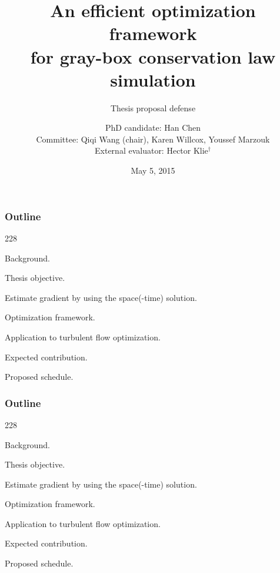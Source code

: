 \documentclass{beamer}
\title{An efficient optimization framework\\ for gray-box conservation law simulation}
\subtitle{Thesis proposal defense}
\author{\scriptsize
   PhD candidate: Han Chen\\\vspace{0.5cm} Committee: Qiqi Wang (chair), Karen Willcox, Youssef Marzouk\\
   External evaluator: Hector Klie$^\dagger$}
\institute{Massachusetts Institute of Technology\\ $^\dagger$ ConocoPhillips Inc.}
\date{\scriptsize May 5, 2015}
\newcommand{\barrow}{\item[\color{darkred}\ding{228}]}
\begin{document}
\begin{frame}
    \titlepage
\end{frame}

\setcounter{framenumber}{0}
\begin{frame}
    \frametitle{Outline}\small
    \begin{dinglist}{228}
        \barrow {}Background.
        \barrow Thesis objective.
        \vspace{.35cm}
        \barrow Estimate gradient by using the space(-time) solution.
        \barrow Optimization framework.
        \barrow Application to turbulent flow optimization.
        \vspace{.35cm}
        \barrow Expected contribution.
        \barrow Proposed schedule.
    \end{dinglist}
\end{frame}

\setcounter{framenumber}{0}
\begin{frame}
    \frametitle{Outline}\small
    \begin{dinglist}{228}
        \barrow Background.
        \barrow Thesis objective.
        \vspace{.35cm}
        \barrow Estimate gradient by using the space(-time) solution.
        \barrow Optimization framework.
        \barrow Application to turbulent flow optimization.
        \vspace{.35cm}
        \barrow Expected contribution.
        \barrow Proposed schedule.
    \end{dinglist}
\end{frame}
\end{document}
